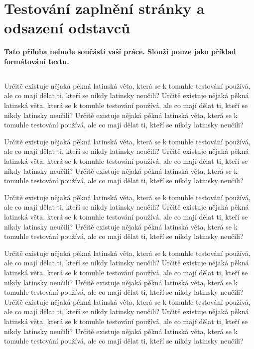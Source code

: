 \documentclass[11pt,twoside,a4paper]{book}
\begin{document}
%

\appendix

\chapter{Testování zaplnění stránky a odsazení odstavců}
\textbf{\large Tato příloha nebude součástí vaší práce. 
Slouží pouze jako příklad formátování textu.}

\section*{}
Určitě existuje nějaká pěkná latinská věta, která se k tomuhle testování používá, ale co mají dělat ti, kteří se nikdy latinsky neučili? Určitě existuje nějaká pěkná latinská věta, která se k tomuhle testování používá, ale co mají dělat ti, kteří se nikdy latinsky neučili? Určitě existuje nějaká pěkná latinská věta, která se k tomuhle testování používá, ale co mají dělat ti, kteří se nikdy latinsky neučili?

Určitě existuje nějaká pěkná latinská věta, která se k tomuhle testování používá, ale co mají dělat ti, kteří se nikdy latinsky neučili? Určitě existuje nějaká pěkná latinská věta, která se k tomuhle testování používá, ale co mají dělat ti, kteří se nikdy latinsky neučili? Určitě existuje nějaká pěkná latinská věta, která se k tomuhle testování používá, ale co mají dělat ti, kteří se nikdy latinsky neučili?

Určitě existuje nějaká pěkná latinská věta, která se k tomuhle testování používá, ale co mají dělat ti, kteří se nikdy latinsky neučili? Určitě existuje nějaká pěkná latinská věta, která se k tomuhle testování používá, ale co mají dělat ti, kteří se nikdy latinsky neučili? Určitě existuje nějaká pěkná latinská věta, která se k tomuhle testování používá, ale co mají dělat ti, kteří se nikdy latinsky neučili?

Určitě existuje nějaká pěkná latinská věta, která se k tomuhle testování používá, ale co mají dělat ti, kteří se nikdy latinsky neučili? Určitě existuje nějaká pěkná latinská věta, která se k tomuhle testování používá, ale co mají dělat ti, kteří se nikdy latinsky neučili? Určitě existuje nějaká pěkná latinská věta, která se k tomuhle testování používá, ale co mají dělat ti, kteří se nikdy latinsky neučili? Určitě existuje nějaká pěkná latinská věta, která se k tomuhle testování používá, ale co mají dělat ti, kteří se nikdy latinsky neučili? Určitě existuje nějaká pěkná latinská věta, která se k tomuhle testování používá, ale co mají dělat ti, kteří se nikdy latinsky neučili? Určitě existuje nějaká pěkná latinská věta, která se k tomuhle testování používá, ale co mají dělat ti, kteří se nikdy latinsky neučili?
\end{document}

